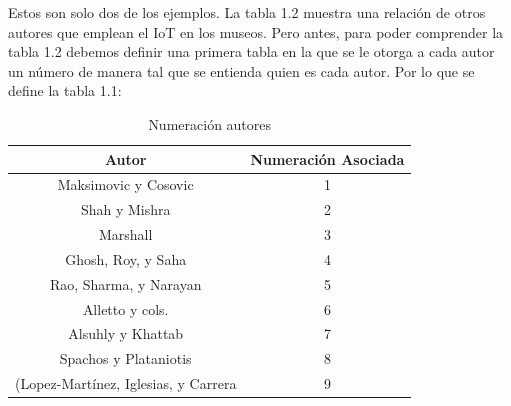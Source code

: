         Estos son solo dos de los ejemplos. La tabla 1.2 muestra una relación de otros autores que emplean el IoT en los museos. Pero antes, para poder comprender la tabla 1.2 debemos definir una primera tabla en la que se le otorga a cada autor un número de manera tal que se entienda quien es cada autor. Por lo que se define la tabla 1.1:

    \begin{table}[H]
        \centering
        \caption{Numeración autores}
        \begin{tabular}{|c|c|}
        \hline
        \rowcolor[HTML]{9698ED} 
        Autor & Numeración Asociada \\ \hline
        Maksimovic y Cosovic \cite{maksimovic}     & 1                   \\ \hline
        Shah y Mishra \cite{shan}     & 2                                \\ \hline
        Marshall \cite{marshall}     & 3                                 \\ \hline
        Ghosh, Roy, y Saha \cite{ghosh}     & 4                          \\ \hline
        Rao, Sharma, y Narayan \cite{rao}     & 5                        \\ \hline
        Alletto y cols. \cite{alletto}     & 6                           \\ \hline
        Alsuhly y Khattab \cite{alsuhly}     & 7                         \\ \hline
        Spachos y Plataniotis \cite{spachos}     & 8                     \\ \hline
        (Lopez-Martínez, Iglesias, y Carrera \cite{lopezmartinez}     & 9\\ \hline
        \end{tabular}
        \label{tab:numeracion_autores}
    \end{table}

